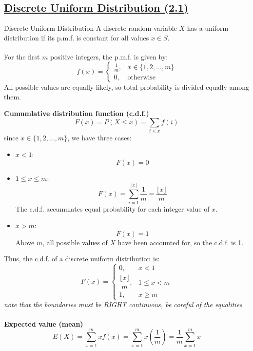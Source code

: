 ﻿\documentclass[12pt]{article}
\begin{document}
\section*{}
\subsection*{\underline{Discrete Uniform Distribution (2.1)}}
\begin{definition}{Discrete Uniform Distribution}
    A discrete random variable $X$ has a uniform distribution if its p.m.f. is constant for all values $x\in S$.\\\\
    For the first $m$ positive integers, the p.m.f. is given by:
    \[
\boxed{f(x) =
\begin{cases}
\frac{1}{m}, & x \in \{1,2,\dots,m\} \\[4pt]
0, & \text{otherwise}
\end{cases}}
\]
    All possible values are equally likely, so total probability is divided equally among them.
\end{definition}
\newpage
\textbf{Cumumlative distribution function (c.d.f.)}\\
\[F(x) = P(X\leq x) = \sum_{i\leq x} f(i)\]
since $x\in\{1,2,\dots,m\}$, we have three cases:
\begin{itemize}
    \item $x<1$: $$F(x)=0$$
    \item $1\leq x\leq m$:
    \[
F(x)=\sum_{i=1}^{\lfloor x\rfloor}\frac1m=\frac{\lfloor x \rfloor}{m}
\]
The c.d.f. accumulates equal probability for each integer value of $x$.
    \item $x>m$: $$F(x)=1$$
Above $m$, all possible values of $X$ have been accounted for, so the c.d.f. is 1.
\end{itemize}
Thus, the c.d.f. of a discrete uniform distribution is:
\[
\boxed{
F(x)=
\begin{cases}
0,&x<1\\[3pt]
\dfrac{\lfloor x\rfloor}{m},&1\leq x<m\\[6pt]
1,&x\geq m
\end{cases}
}
\]
\textit{note that the boundaries must be RIGHT continuous, be careful of the equalities}\\\\
\textbf{Expected value (mean)}
\[
E(X)=\sum_{x=1}^{m}xf(x)=\sum_{x=1}^{m}x\left(\frac1m\right)=\frac1m\sum_{x=1}^{m}x
\]
\end{document}

